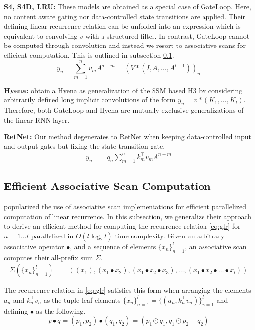 \documentclass{article} \usepackage{iclr2024_conference,times}
\begin{document}
\textbf{S4, S4D, LRU:} These models are obtained as a special case of GateLoop. Here, no content aware gating nor data-controlled state transitions are applied. Their defining linear recurrence relation can be unfolded into an expression which  is equivalent to convolving $v$ with a structured filter. In contrast, GateLoop cannot be computed through convolution and instead we resort to associative scans for efficient computation. This is outlined in subsection \ref{sec:scan}.
\begin{equation} \label{eq:s4}
y_n = \sum_{m=1}^{n} v_m A^{n-m} = (V * (I, A, \dots, A^{l-1}))_n
\end{equation}

\textbf{Hyena:} \cite{poli2023hyena} obtain a Hyena as generalization of the SSM based H3 by considering arbitrarily defined long implicit convolutions of the form $y_n = v * (K_1, \dots, K_l)$. Therefore, both GateLoop and Hyena are mutually exclusive generalizations of the linear RNN layer. 

\textbf{RetNet:} Our method degenerates to RetNet when keeping data-controlled input and output gates but fixing the state transition gate. 
\begin{align} \label{eq:retnet}
y_n &= q_n \sum_{m=1}^{n} k_m^\top v_m A^{n-m}
\end{align}





\subsection{Efficient Associative Scan Computation}\label{sec:scan}
\cite{smith2023simplified} popularized the use of associative scan implementations for efficient parallelized computation of linear recurrence. In this subsection, we generalize their approach to derive an efficient method for computing the recurrence relation \ref{eq:glr} for $n = 1 \dots l$ parallelized in $O(l \log_2 l)$ time complexity. Given an arbitrary associative operator $\bullet$, and a sequence of elements $\{ x_n \}_{n=1}^{l}$, an associative scan computes their all-prefix sum $\Sigma$. 
\begin{align}
\Sigma(\{ x_n \}_{n=1}^{l}) &= ((x_1), (x_1 \bullet x_2), (x_1 \bullet x_2 \bullet x_3), \ldots, (x_1 \bullet x_2 \bullet \ldots \bullet x_l))
\end{align}

The recurrence relation in \ref{eq:glr} satisfies this form when arranging the elements $a_n$ and $k_n^\top v_n$ as the tuple leaf elements $\{ x_n \}_{n=1}^{l} = \{(a_n, k_n^\top v_n)\}_{n=1}^{l}$ and defining $\bullet$ as the following. 
\begin{equation}\label{eq:operator}
p \bullet q = (p_1, p_2) \bullet (q_1, q_2) = (p_1 \odot q_1, q_1 \odot p_2 + q_2)
\end{equation}
\end{document}

